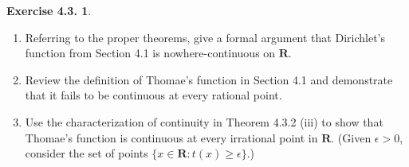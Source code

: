 \documentclass[12pt]{article}
\theoremstyle{definition}
\theoremstyle{exercise}
\newtheorem{exercise}{Exercise 4.3.}
\theoremstyle{solution}
\newcommand{\R}{\mathbf{R}}
\begin{document}
\begin{exercise}
\label{ex:7}
    \begin{enumerate}
        \item Referring to the proper theorems, give a formal argument that Dirichlet's function from Section 4.1 is nowhere-continuous on \( \R \).

        \item Review the definition of Thomae's function in Section 4.1 and demonstrate that it fails to be continuous at every rational point.

        \item Use the characterization of continuity in Theorem 4.3.2 (iii) to show that Thomae's function is continuous at every irrational point in \( \R \). (Given \( \epsilon > 0 \), consider the set of points \( \{ x \in \R : t(x) \geq \epsilon \} \).)
    \end{enumerate}
\end{exercise}
\end{document}
